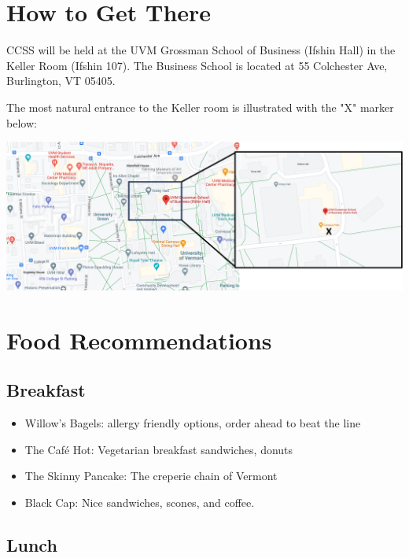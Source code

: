 \section{How to Get There}

CCSS will be held at the UVM Grossman School of Business (Ifshin Hall) in the Keller Room (Ifshin 107). The Business School is located at 55 Colchester Ave, Burlington, VT 05405.

The most natural entrance to the Keller room is illustrated with the "X" marker below:

\includegraphics[width=\textwidth]{images/map.png}


\section{Food Recommendations}

\subsection{Breakfast}

\begin{itemize}
    \item Willow's Bagels: allergy friendly options, order ahead to beat the line
    \item The Café Hot: Vegetarian breakfast sandwiches, donuts
    \item The Skinny Pancake: The creperie chain of Vermont
    \item Black Cap: Nice sandwiches, scones, and coffee.
\end{itemize}

\subsection{Lunch}


